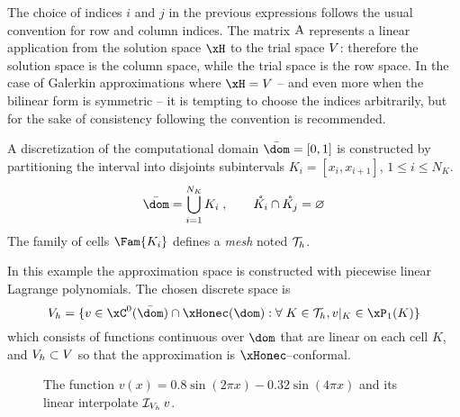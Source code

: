 \medskip
\begin{rmrk}
The choice of indices $i$ and $j$ in the previous expressions follows the usual convention for row and column indices. The matrix ${\mathrm A}$ represents a linear application from the solution space $\xH$ to the trial space ${V}$: therefore the solution space is the column space, while the trial space is the row space.
In the case of Galerkin approximations where $\xH = \xV$ -- and even more when the bilinear form is symmetric -- it is tempting to choose the indices arbitrarily, but for the sake of consistency following the convention is recommended.
\end{rmrk}

\medskip
A discretization of the computational domain $\bar\dom = [0,1]$ is constructed by partitioning the interval into disjoints subintervals $K_i = [x_{i}, x_{i+1}]$, $1\leq i \leq N_K$.
\begin{equation*}
\bar\dom = \displaystyle\Union_{i = 1}^{N_K} K_i\;,\qquad \Interior{K_i}\cap \Interior{K_j} = \Empty
\end{equation*}
The family of cells $\Fam{K_i}$ defines a \textit{mesh} noted ${\mathcal T}_h$.

\medskip
In this example the approximation space is constructed with piecewise linear Lagrange polynomials.
The chosen discrete space is
\begin{equation}\label{sp:lagrangeP1}
\xVh = \lbrace v \in \xC^0(\bar\dom)\cap\xHonec(\dom) : \forany K \in \meshT, v\rvert_{K} \in \xPone(K) \rbrace
\end{equation}
which consists of functions continuous over $\dom$ that are linear on each cell $K$, and ${{V}}_h \subset {V}$ so that the approximation is $\xHonec$--conformal.

\begin{figure}[h!]
\centering
{}
\caption{The function $v(x) = 0.8 \sin(2\pi x) - 0.32 \sin(4\pi x)$ and its linear interpolate $\mathop{\mathcal{I}_{{{V}}_h}} v$.}
\end{figure}

